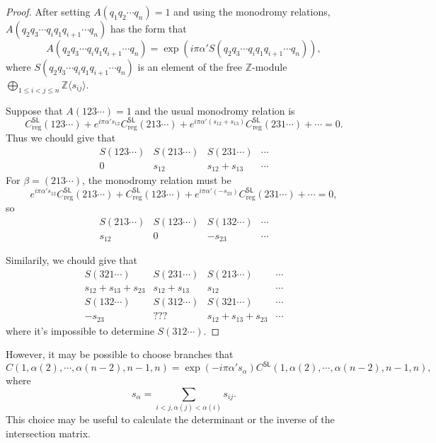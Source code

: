 \documentclass[11pt]{article}
\newcommand{\zz}{\mathbb{Z}}
\theoremstyle{definition}
\theoremstyle{plain}
\begin{document}
\begin{proof}
After setting $A(q_1q_2\cdots q_n)=1$ and using the monodromy relations, 
$A(q_2q_3\cdots q_iq_1q_{i+1}\cdots q_n)$ has the form that
\[
	A(q_2q_3\cdots q_iq_1q_{i+1}\cdots q_n)
	=\exp(i\pi\alpha'S(q_2q_3\cdots q_iq_1q_{i+1}\cdots q_n)),
\]
where $S(q_2q_3\cdots q_iq_1q_{i+1}\cdots q_n)$ is an element of 
the free $\zz$-module $\bigoplus_{1\leq i<j\leq n}\zz\langle s_{ij}\rangle$.

Suppose that $A(123\cdots)=1$ and the usual monodromy relation is 
\[
	C_{\text{reg}}^{\mathsf{SL}}(123\cdots)+e^{i\pi\alpha's_{12}}C_{\text{reg}}^{\mathsf{SL}}(213\cdots)
	+e^{i\pi\alpha'(s_{12}+s_{13})}C_{\text{reg}}^{\mathsf{SL}}(231\cdots)+\cdots =0.
\]
Thus we chould give that
\[
	\begin{matrix}
		S(123\cdots)& S(213\cdots) & S(231\cdots) & \cdots \\
		0&s_{12}&s_{12}+s_{13}&\cdots
	\end{matrix}
\]
For $\beta=(213\cdots )$, the monodromy relation must be
\[
	e^{i\pi\alpha's_{12}}C_{\text{reg}}^{\mathsf{SL}}(213\cdots)+C_{\text{reg}}^{\mathsf{SL}}(123\cdots)
	+e^{i\pi\alpha'(-s_{23})}C_{\text{reg}}^{\mathsf{SL}}(231\cdots )+\cdots =0,
\]
so
\[
	\begin{matrix}
		S(213\cdots )& S(123\cdots ) & S(132\cdots ) & \cdots\\
		s_{12}&0&-s_{23}&\cdots
	\end{matrix}
\]

Similarily, we chould give that
\[
	\begin{matrix}
		S(321\cdots )& S(231\cdots ) & S(213\cdots ) & \cdots \\
		s_{12}+s_{13}+s_{23}&s_{12}+s_{13}&s_{12}&\cdots \\
		S(132\cdots )& S(312\cdots ) & S(321\cdots ) & \cdots \\
		-s_{23}&???&s_{12}+s_{13}+s_{23}&\cdots 
	\end{matrix}
\]
where it's impossible to determine $S(312\cdots )$. 
\end{proof}

However, it may be possible to choose branches that
\[
	C(1,\alpha(2),\cdots ,\alpha(n-2),n-1,n)
	=\exp(-i\pi \alpha' s_{\alpha})C^{\mathsf{SL}}(1,\alpha(2),\cdots ,\alpha(n-2),n-1,n),
\]
where 
\[
	s_{\alpha}=\sum_{i<j,\alpha(j)<\alpha(i)}s_{ij}.
\]
This choice may be useful to calculate the determinant or the inverse of
the intersection matrix.
\end{document}
